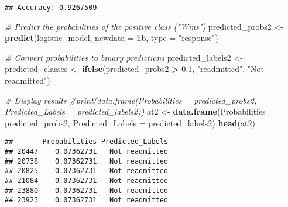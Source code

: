 \documentclass[
]{article}
\newenvironment{Shaded}{\begin{snugshade}}{\end{snugshade}}
\newcommand{\AttributeTok}[1]{\textcolor[rgb]{0.13,0.29,0.53}{#1}}
\newcommand{\CommentTok}[1]{\textcolor[rgb]{0.56,0.35,0.01}{\textit{#1}}}
\newcommand{\DecValTok}[1]{\textcolor[rgb]{0.00,0.00,0.81}{#1}}
\newcommand{\DocumentationTok}[1]{\textcolor[rgb]{0.56,0.35,0.01}{\textbf{\textit{#1}}}}
\newcommand{\FloatTok}[1]{\textcolor[rgb]{0.00,0.00,0.81}{#1}}
\newcommand{\FunctionTok}[1]{\textcolor[rgb]{0.13,0.29,0.53}{\textbf{#1}}}
\newcommand{\NormalTok}[1]{#1}
\newcommand{\OtherTok}[1]{\textcolor[rgb]{0.56,0.35,0.01}{#1}}
\newcommand{\SpecialCharTok}[1]{\textcolor[rgb]{0.81,0.36,0.00}{\textbf{#1}}}
\newcommand{\StringTok}[1]{\textcolor[rgb]{0.31,0.60,0.02}{#1}}
\begin{document}
\begin{Shaded}
\end{Shaded}

\begin{verbatim}
## Accuracy: 0.9267509
\end{verbatim}

\begin{Shaded}
\begin{Highlighting}[]
\CommentTok{\# Predict the probabilities of the positive class ("Wins")}
\NormalTok{predicted\_probs2 }\OtherTok{\textless{}{-}} \FunctionTok{predict}\NormalTok{(logistic\_model, }\AttributeTok{newdata =}\NormalTok{ lib, }\AttributeTok{type =} \StringTok{"response"}\NormalTok{)}


\CommentTok{\# Convert probabilities to binary predictions}
\NormalTok{predicted\_labels2 }\OtherTok{\textless{}{-}}\NormalTok{ predicted\_classes }\OtherTok{\textless{}{-}} \FunctionTok{ifelse}\NormalTok{(predicted\_probs2 }\SpecialCharTok{\textgreater{}} \FloatTok{0.1}\NormalTok{, }\StringTok{"readmitted"}\NormalTok{, }\StringTok{"Not readmitted"}\NormalTok{)}

\CommentTok{\# Display results}
\CommentTok{\#print(data.frame(Probabilities = predicted\_probs2, Predicted\_Labels = predicted\_labels2))}
\NormalTok{at2 }\OtherTok{\textless{}{-}} \FunctionTok{data.frame}\NormalTok{(}\AttributeTok{Probabilities =}\NormalTok{ predicted\_probs2, }\AttributeTok{Predicted\_Labels =}\NormalTok{ predicted\_labels2)}
\FunctionTok{head}\NormalTok{(at2)}
\end{Highlighting}
\end{Shaded}

\begin{verbatim}
##       Probabilities Predicted_Labels
## 20447    0.07362731   Not readmitted
## 20738    0.07362731   Not readmitted
## 20825    0.07362731   Not readmitted
## 21084    0.07362731   Not readmitted
## 23880    0.07362731   Not readmitted
## 23923    0.07362731   Not readmitted
\end{verbatim}
\end{document}
